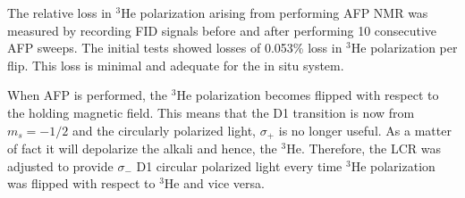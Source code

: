 

The relative loss in $^3$He polarization arising from performing AFP NMR was measured by recording FID signals before and after performing 10 consecutive AFP sweeps. The initial tests showed losses of 0.053\% loss in $^3$He polarization per flip. This loss is minimal and adequate for the in situ system.

When AFP is performed, the $^3$He polarization becomes flipped with respect to the holding magnetic field. This means that the D1 transition is now from $m_s=-1/2$ and the circularly polarized light, $\sigma_+$ is no longer useful. As a matter of fact it will depolarize the alkali and hence, the $^3$He. Therefore, the LCR was adjusted to provide $\sigma_-$ D1 circular polarized light every time $^3$He polarization was flipped with respect to $^3$He and vice versa.

